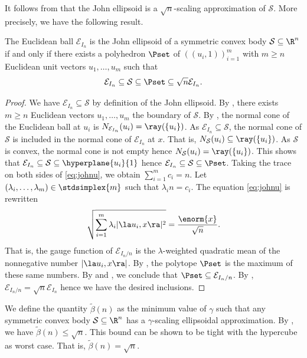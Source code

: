 \documentclass[11pt,twoside,a4paper,openright]{uclouvain-thesis}
\newcommand{\johnintm}{\beta}
\newcommand{\johnint}{\tilde{\johnintm}}
\begin{document}
It follows from  that the John ellipsoid is a $\sqrt{n}$-scaling
approximation of $\mathcal{S}$. More precisely, we have the following result.

\begin{mytheo}
  \label{theo:john}
  The Euclidean ball $\mathcal{E}_{I_n}$ is the John ellipsoid of a symmetric convex body $\mathcal{S} \subseteq \R^n$
  if and only if there exists a polyhedron $\Pset$ of \hrep{}
  $((u_i, 1))_{i=1}^m$ with $m \ge n$ Euclidean unit vectors $u_1, \ldots, u_m$
  such that
  \[ \mathcal{E}_{I_n} \subseteq \mathcal{S} \subseteq \Pset \subseteq \sqrt{n} \mathcal{E}_{I_n}.\]
  \begin{proof}
    We have $\mathcal{E}_{I_n} \subseteq \mathcal{S}$ by definition of the
    John ellipsoid.
    By , there exists $m \ge n$ Euclidean vectors $u_1, \ldots, u_m$ the boundary of $\mathcal{S}$.
    By , the normal cone of the Euclidean ball at $u_i$ is $N_{\mathcal{E}_{I_n}}(u_i) = \ray(\{u_i\})$.
    As $\mathcal{E}_{I_n} \subseteq \mathcal{S}$, the normal cone of $\mathcal{S}$
    is included in the normal cone of $\mathcal{E}_{I_n}$ at $x$.
    That is, $N_{\mathcal{S}}(u_i) \subseteq \ray(\{u_i\})$.
    As $\mathcal{S}$ is convex, the normal cone is not empty hence $N_{\mathcal{S}}(u_i) = \ray(\{u_i\})$.
    This shows that $\mathcal{E}_{I_n} \subseteq \mathcal{S} \subseteq \hyperplane{u_i}{1}$ hence
    $\mathcal{E}_{I_n} \subseteq \mathcal{S} \subseteq \Pset$.
    Taking the trace on both sides of \eqref{eq:johnu},
    we obtain $\sum_{i = 1}^m c_i = n$.
    Let $(\lambda_i, \ldots, \lambda_m) \in \stdsimplex{m}$ such that $\lambda_i n = c_i$.
    The equation \eqref{eq:johnu} is rewritten
    \begin{equation*}
      \sqrt{\sum_{i=1}^m \lambda_i |\la u_i, x \ra|^2} = \frac{\enorm{x}}{\sqrt{n}}.
    \end{equation*}
    That is, the gauge function of $\mathcal{E}_{I_n/n}$ is the $\lambda$-weighted
    quadratic mean of the nonnegative number $|\la u_i, x \ra|$.
    By , the polytope $\Pset$ is the maximum of these
    same numbers.
    By  and , we conclude that
    $\Pset \subseteq \mathcal{E}_{I_n/n}$.
    By , $\mathcal{E}_{I_n/n} = \sqrt{n}\mathcal{E}_{I_n}$ hence
    we have the desired inclusions.
  \end{proof}
\end{mytheo}

We define the quantity $\johnint(n)$
as the minimum value of $\gamma$ such that any symmetric convex body $\mathcal{S} \subseteq \R^n$
has a $\gamma$-scaling ellipsoidal approximation.
By , we have $\johnint(n) \le \sqrt{n}$.
This bound can be shown to be tight with the hypercube as worst case.
That is, $\johnint(n) = \sqrt{n}$.
\end{document}
